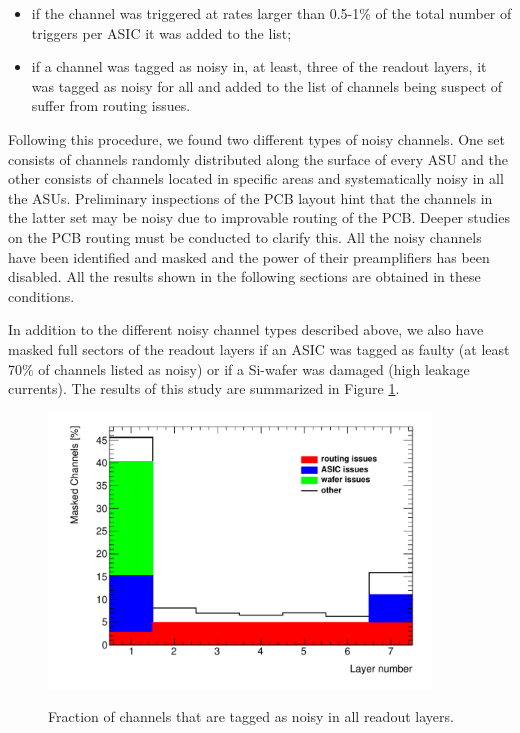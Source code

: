 \documentclass[a4paper,11pt]{article}
\begin{document}
\begin{itemize}
\item if the channel was triggered at rates larger than 0.5-1\% of the total number of triggers per ASIC it was added to the list;
\item if a channel was tagged as noisy in, at least, three of the readout layers, it was tagged as noisy for all and added to the list of channels being suspect of suffer from routing issues.
\end{itemize}

Following this procedure, we found two different types of noisy channels. One set consists of
channels randomly distributed along the surface of every ASU and the other consists
of channels located in specific areas and systematically noisy in all the ASUs. Preliminary inspections of the PCB layout
hint that the channels in the latter set may be noisy due to
improvable routing of the PCB.
Deeper studies on the PCB routing must be conducted to clarify this.
All the noisy channels have been identified and masked and the power
of their preamplifiers has been disabled. All the results shown in the following
sections are obtained in these conditions.

In addition to the different noisy channel types described above, we also have
masked full sectors of the readout layers if an ASIC was tagged as faulty (at least 70\% of channels 
listed as noisy) or if a Si-wafer was damaged (high leakage currents).
The results of this study are summarized in Figure \ref{noisycells}.

\begin{figure}[!t]
  \centering
  \includegraphics[width=4in]{masked_layer-eps-converted-to.pdf} \\
\caption{Fraction of channels that are tagged as noisy in all readout layers.}
\label{noisycells}
\end{figure}
\end{document}
